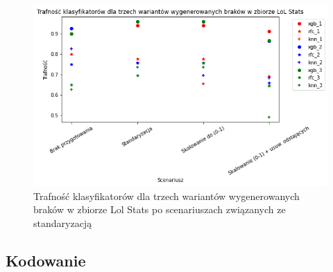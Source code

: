 \documentclass{book}
\begin{document}
    \begin{figure}[H]
        \centerline{\includegraphics[scale=0.8]{Lol_stats_Standaryzacja}}
        \centering
        \caption{Trafność klasyfikatorów dla trzech wariantów wygenerowanych braków w zbiorze Lol Stats po scenariuszach związanych ze standaryzacją}
        \end{figure}


\subsection{Kodowanie}
\end{document}
